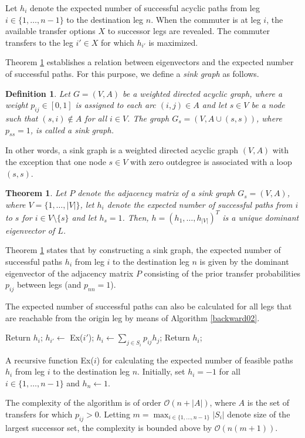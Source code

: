 \documentclass[dissertation,draft*]{aaltoseries}
\newtheorem{theorem}{Theorem}
\newtheorem*{definition}{Definition}
\begin{document}
Let $h_i$ denote the expected number of successful acyclic paths from leg $i \in \{1,\ldots,n-1\}$ 
to the destination leg $n$. When the commuter is
at leg $i$, the available transfer options $X$ to successor legs are revealed. 
The commuter transfers to the leg $i' \in X$ for which $h_{i'}$ is maximized.

Theorem \ref{epolut} establishes a relation between eigenvectors and the expected number of successful paths.
For this purpose, we define a \emph{sink graph} as follows.
\begin{definition}
  Let $G=(V,A)$ be a weighted directed acyclic graph, where a weight $p_{ij} \in [0,1]$ is assigned to each arc $(i,j) \in A$
and let $s \in V$ be a node such that $(s,i) \notin A$ for all $i \in V$.
The graph $G_s=(V, A \cup (s,s))$, where $p_{ss}=1$, is called a \emph{sink graph}. 
\end{definition}
In other words, a sink graph is a weighted directed acyclic graph $(V,A)$ with the exception that one node $s \in V$ with zero outdegree is
associated with a loop $(s,s)$.

\begin{theorem}
\label{epolut}
Let $P$ denote the adjacency matrix of a sink graph $G_s=(V,A)$, where $V=\{1,\ldots,|V|\}$,  
let $h_i$ denote the expected number of successful paths from $i$ to $s$ for $i \in V \setminus \{s\}$ and let $h_s=1$. 
Then, $h=(h_1,\ldots,h_{|V|})^T$ is a unique dominant eigenvector of $L$.
\end{theorem}
Theorem \ref{epolut} states that by constructing a sink graph, the expected number of successful paths $h_i$ from leg $i$ to the destination leg $n$
is given by the dominant eigenvector of the adjacency matrix $P$ consisting of the prior transfer probabilities $p_{ij}$
between legs (and $p_{nn}=1$). 

The expected number of successful paths can also be calculated for all legs that are reachable from the 
origin leg by means of Algorithm \ref{backward02}.
\begin{algorithm}
\begin{algorithmic}
\STATE Return $h_i$;
\ENDIF
{}
\STATE $h_{i'} \leftarrow $ Ex($i'$); 
\ENDFOR
\STATE $h_i \leftarrow \sum_{j \in S_i} p_{ij} h_j$;
\STATE Return $h_i$;
\end{algorithmic}
\caption{A recursive function Ex($i$) for calculating the expected number of feasible 
paths $h_i$ from leg $i$ to the destination leg $n$. 
Initially, set $h_i=-1$ for all $i \in \{1,\ldots,n-1\}$ and $h_n \leftarrow 1$.}
\label{backward02}
\end{algorithm}
The complexity of the algorithm is of order $\mathcal{O}(n+|A|)$, where $A$ is the set of transfers for which $p_{ij} > 0$.
Letting $m = \max_{i \in \{1,\ldots,n-1\}} |S_i|$ denote size of the largest successor set, the complexity
is bounded above by $\mathcal{O}(n(m+1))$.
\end{document}
